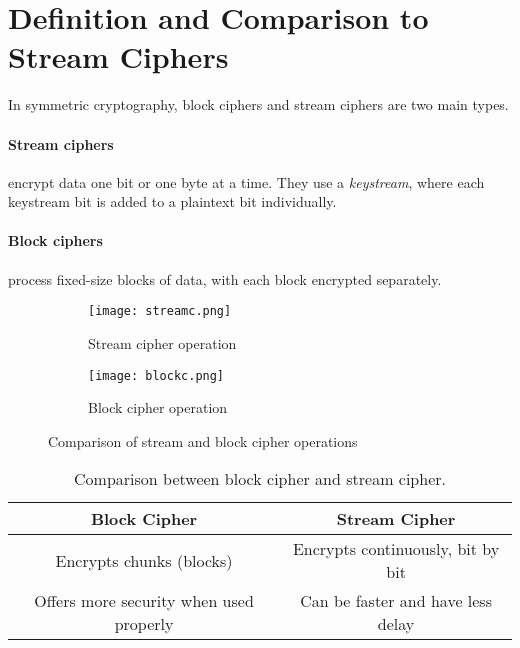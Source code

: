 \section{Definition and Comparison to Stream Ciphers}

In symmetric cryptography, block ciphers and stream ciphers are two main types.

\paragraph{Stream ciphers} encrypt data one bit or one byte at a time. 
They use a \textit{keystream}, where each keystream bit is added to a plaintext bit individually.

\paragraph{Block ciphers} process fixed-size blocks of data, with each block encrypted separately.


\begin{figure}[h]
    \centering
    \begin{subfigure}[b]{0.45\textwidth}
        \centering
        \texttt{[image: streamc.png]}
        \caption{Stream cipher operation}
        \label{fig:stream_cipher}
    \end{subfigure}
    \hfill
    \begin{subfigure}[b]{0.45\textwidth}
        \centering
        \texttt{[image: blockc.png]}
        \caption{Block cipher operation}
        \label{fig:block_cipher}
    \end{subfigure}
    \caption{Comparison of stream and block cipher operations}
    \label{fig:cipher_comparison}
\end{figure}



\begin{table}[h]
\centering
\begin{tabular}{|c|c|}
\hline
\textbf{Block Cipher} & \textbf{Stream Cipher} \\
\hline
Encrypts chunks (blocks) & Encrypts continuously, bit by bit \\
\hline
Offers more security when used properly & Can be faster and have less delay \\
\hline
\end{tabular}
\caption{Comparison between block cipher and stream cipher.}
\label{tab:block_vs_stream}
\end{table}